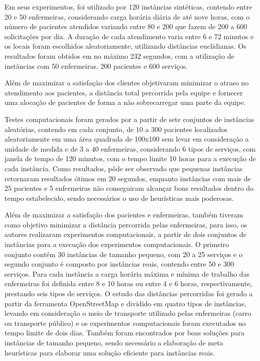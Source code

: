 Em seus experimentos, foi utilizado por  120 instâncias sintéticas, contendo entre 20 e 50 enfermeiras, considerando carga horária diária de até nove horas, com o número de pacientes atendidos variando entre 80 e 200 que fazem de 200 a 600 solicitações por dia. A duração de cada atendimento varia entre 6 e 72 minutos e os locais foram escolhidos aleatoriamente, utilizando distâncias euclidianas.
Os resultados foram obtidos em no máximo 232 segundos, com a utilização de instâncias com 50 enfermeiras, 200 pacientes e 600 serviços.

Além de maximizar a satisfação dos clientes  objetivaram minimizar o atraso no atendimento aos pacientes, a distância total percorrida pela equipe e fornecer uma alocação de pacientes de forma a não sobrecarregar uma parte da equipe.

Testes computacionais foram gerados por   a partir de sete conjuntos de instâncias aleatórias, contendo em cada conjunto, de 10 a 300 pacientes localizados aleatoriamente em uma área quadrada de 100x100 sem levar em consideração a unidade de medida e de 3 a 40 enfermeiras, considerando 6 tipos de serviços, com janela de tempo de 120 minutos, com o tempo limite 10 horas para a execução de cada instância. 
Como resultados, pôde ser observado que pequenas instâncias retornaram resultados ótimos em 20 segundos, enquanto instâncias com mais de 25 pacientes e 5 enfermeiras não conseguiram alcançar bons resultados dentro do tempo estabelecido, sendo necessários o uso de heurísticas mais poderosas.

Além de maximizar a satisfação dos pacientes e enfermeiras,  também tiveram como objetivo minimizar a distância percorrida pelas enfermeiras, para isso, os autores realizaram experimentos computacionais, a partir de dois conjuntos de instâncias para a execução dos experimentos computacionais. 
O primeiro conjunto contém 30 instâncias de tamanho pequeno, com 20 a 25 serviços e o segundo conjunto é composto por instâncias reais, contendo entre 50 e 300 serviços. 
Para cada instância a carga horária máxima e mínima de trabalho das enfermeiras foi definida entre 8 e 10 horas ou entre 4 e 6 horas, respectivamente, prestando seis tipos de serviços.
O estudo das distâncias percorridas foi gerado a partir da ferramenta OpenStreetMap e dividido em quatro tipos de instâncias, levando em consideração o meio de transporte utilizado pelas enfermeiras (carro ou transporte público) e os experimentos computacionais foram executados no tempo limite de dois dias. Também foram encontrados por  boas soluções para instâncias de tamanho pequeno, sendo necessário a elaboração de meta heurísticas para elaborar uma solução eficiente para instâncias reais. 

